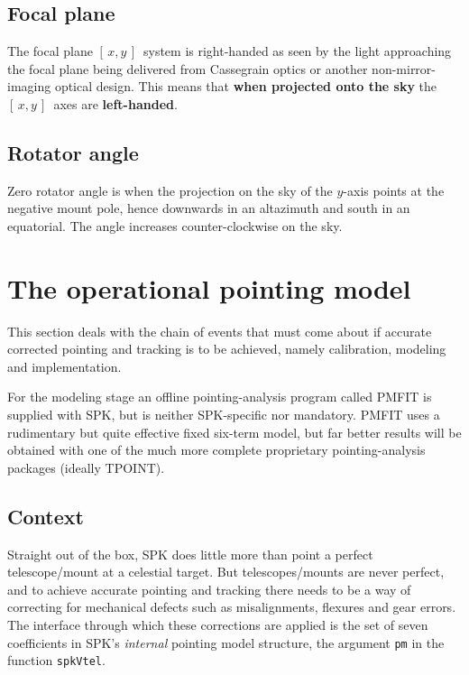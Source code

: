 \documentclass[11pt,fleqn,twoside,\paper]{article}
\renewcommand{\_}{{\tt\char'137}}     %
\newcommand{\xy}        {$[\,x,y\,]$}
\begin{document}
\subsection{Focal plane}
The focal plane \xy\ system is right-handed as seen by the
light approaching the focal plane being delivered from Cassegrain
optics or another non-mirror-imaging optical design.  This means
that {\bf when projected onto the sky} the \xy\ axes are
{\bf left-handed}.

\subsection{Rotator angle}
Zero rotator angle is when the projection on the sky of the
$y$-axis points at the negative mount pole, hence downwards in
an altazimuth and south in an equatorial.  The angle increases
counter-clockwise on the sky.


\newpage

\section{The operational pointing model}
\label{opm}
This section deals with the chain of events that must
come about if accurate corrected pointing and tracking
is to be achieved, namely
calibration, modeling and implementation.

For the modeling stage an offline pointing-analysis
program called PMFIT is supplied with SPK, but is
neither SPK-specific
nor mandatory.  PMFIT uses a rudimentary but quite
effective fixed six-term model, but far better
results will be obtained with one of the much more complete
proprietary pointing-analysis packages (ideally TPOINT).

\subsection{Context}

Straight out of the box,
SPK does little more than point a perfect telescope/mount
at a celestial target.
But telescopes/mounts are never perfect, and to
achieve accurate pointing and tracking there needs to be a way of
correcting for mechanical defects such as
misalignments, flexures and gear errors.
The interface through which these
corrections are applied is the set of seven coefficients
in SPK's {\it internal} pointing model structure,
the argument {\tt pm} in the function {\tt spkVtel}.
\end{document}
